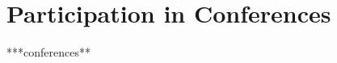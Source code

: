 \documentclass[10pt]{article}
\makeatletter
\renewcommand{\labelenumi}{\@biblabel{A\theenumi}} %
\makeatother
\begin{document}




\let\originalbibitem\bibitem
\def\bibitem#1#2\par{%
  \noexpandarg
  \originalbibitem{#1}
  \par}

\nocite{Faria2016a}
\nocite{Faria2016b}
\nocite{Figueira2014}
\nocite{Mortier2015a}
\nocite{Mortier2015b}
\nocite{Santos2014}

\renewcommand\refname{Selected publications}

% 







\section{Participation in Conferences}
\begin{itemize}

  ***conferences**

\end{itemize}


\ifteaching
\end{document}
